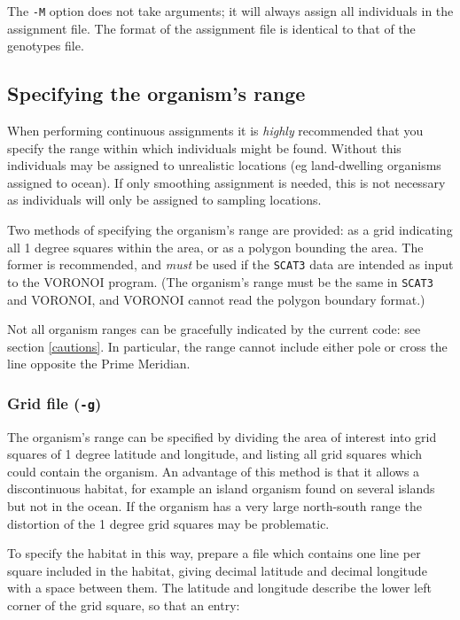 \documentclass[10pt,titlepage,times,letterpaper]{article}
\def\SCAT{{\tt SCAT3} }
\begin{document}
The {\tt -M} option does not take arguments; it will always assign all
individuals in the assignment file.  The format of the assignment
file is identical to that of the genotypes file.
 
\subsection{Specifying the organism's range} \label{boundary}

When performing continuous assignments it is {\it highly}
recommended that you specify the range within which individuals might
be found. Without this individuals may be assigned to unrealistic
locations (eg land-dwelling organisms assigned to ocean).  If only
smoothing assignment is needed, this is not necessary as individuals will
only be assigned to sampling locations.

Two methods of specifying the organism's range are provided:  as
a grid indicating all 1 degree squares within the area, or as a polygon
bounding the area.  The former is recommended, and {\it must} be
used if the \SCAT data are intended as input to the VORONOI program.  (The
organism's range must be the same in \SCAT and VORONOI, and VORONOI cannot
read the polygon boundary format.) 

Not all organism ranges can be gracefully indicated by the current code:
see section \ref{cautions}.  In particular, the range cannot include either pole
or cross the line opposite the Prime Meridian.

\subsubsection{Grid file  ({\tt -g})}

The organism's range can be specified by dividing the area of interest into grid
squares of 1 degree latitude and longitude, and listing all grid squares which could
contain the organism.  An advantage of this method is that it allows a discontinuous
habitat, for example an island organism found on several islands but not in the ocean.
If the organism has a very large 
north-south range the distortion of the 1 degree grid squares may be problematic.

To specify the habitat in this way, prepare a file which contains one line per
square included in the habitat, giving decimal latitude and decimal longitude with
a space between them.  The latitude and longitude describe the lower left corner of
the grid square, so that an entry:
\end{document}
